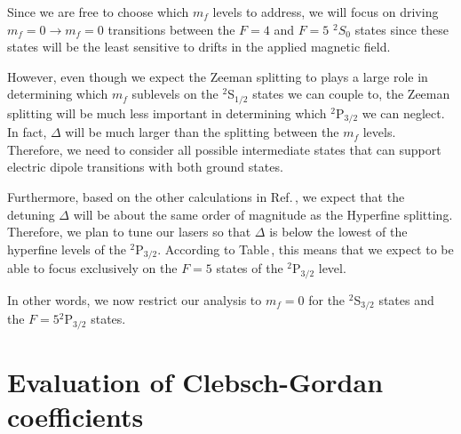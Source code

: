 Since we are free to choose which $m_f$ levels to address, we will focus on driving $m_f=0\rightarrow m_f=0$ transitions between the $F=4$ and $F=5$ $^2 S_{0}$ states since these states will be the least sensitive to drifts in the applied magnetic field. 

However, even though we expect the Zeeman splitting to plays a large role in determining which $m_f$ sublevels on the $^2$S$_{1/2}$ states we can couple to, the Zeeman splitting will be much less important in determining which $^2$P$_{3/2}$ we can neglect. In fact, $\Delta$ will be much larger than the splitting between the $m_f$ levels. Therefore, we need to consider all possible intermediate states that can support electric dipole transitions with both ground states. %


Furthermore, based on the other calculations in Ref.\,\cite{cjeDiss}, we expect that the detuning $\Delta$ will be about the same order of magnitude as the Hyperfine splitting. Therefore, we plan to tune our lasers so that $\Delta$ is below the lowest of the hyperfine levels of the $^2$P$_{3/2}$. According to Table\,\cite{tableOfHyperfinedeetuings}, this means that we expect to be able to focus exclusively on the $F=5$ states of the $^2$P$_{3/2}$ level.

In other words, we now restrict our analysis to $m_f=0$ for the $^2$S$_{3/2}$ states and the $F=5$$^2$P$_{3/2}$ states.

\section{Evaluation of Clebsch-Gordan coefficients}

